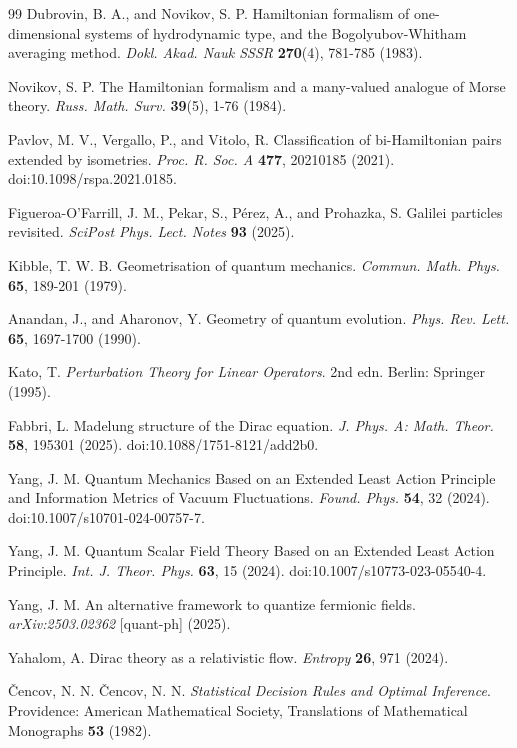 \documentclass[11pt,a4paper]{article}
\numberwithin{equation}{section}
\theoremstyle{thmcompact}
\theoremstyle{remark}
\begin{document}
\begin{thebibliography}{99}
	Dubrovin, B. A., and Novikov, S. P. Hamiltonian formalism of one-dimensional systems of hydrodynamic type, and the Bogolyubov-Whitham averaging method. \emph{Dokl. Akad. Nauk SSSR} \textbf{270}(4), 781-785 (1983).
	
	Novikov, S. P. The Hamiltonian formalism and a many-valued analogue of Morse theory. \emph{Russ. Math. Surv.} \textbf{39}(5), 1-76 (1984).
	
	Pavlov, M. V., Vergallo, P., and Vitolo, R. Classification of bi-Hamiltonian pairs extended by isometries. \emph{Proc. R. Soc. A} \textbf{477}, 20210185 (2021). doi:10.1098/rspa.2021.0185.
	
	Figueroa-O’Farrill, J. M., Pekar, S., Pérez, A., and Prohazka, S. Galilei particles revisited. \emph{SciPost Phys. Lect. Notes} \textbf{93} (2025).
	
	Kibble, T. W. B. Geometrisation of quantum mechanics. \emph{Commun. Math. Phys.} \textbf{65}, 189-201 (1979).
	
	Anandan, J., and Aharonov, Y. Geometry of quantum evolution. \emph{Phys. Rev. Lett.} \textbf{65}, 1697-1700 (1990).
	
	Kato, T. \emph{Perturbation Theory for Linear Operators}. 2nd edn. Berlin: Springer (1995).
	
	Fabbri, L. Madelung structure of the Dirac equation. \emph{J. Phys. A: Math. Theor.} \textbf{58}, 195301 (2025). doi:10.1088/1751-8121/add2b0.
	
	Yang, J. M. Quantum Mechanics Based on an Extended Least Action Principle and Information Metrics of Vacuum Fluctuations. \emph{Found. Phys.} \textbf{54}, 32 (2024). doi:10.1007/s10701-024-00757-7.
	
	Yang, J. M. Quantum Scalar Field Theory Based on an Extended Least Action Principle. \emph{Int. J. Theor. Phys.} \textbf{63}, 15 (2024). doi:10.1007/s10773-023-05540-4.
	
	Yang, J. M. An alternative framework to quantize fermionic fields. \emph{arXiv:2503.02362} [quant-ph] (2025).
	
	Yahalom, A. Dirac theory as a relativistic flow. \emph{Entropy} \textbf{26}, 971 (2024).
	
	\ifdefined\CyrillicEncoding
	Čencov, N. N.
	\else
	\v{C}encov, N. N.
	\fi
	\emph{Statistical Decision Rules and Optimal Inference}. Providence: American Mathematical Society, Translations of Mathematical Monographs \textbf{53} (1982).
	

\end{thebibliography}
\end{document}
